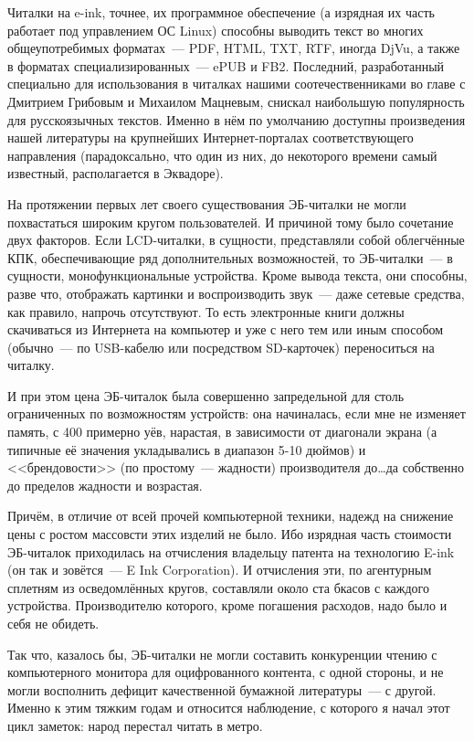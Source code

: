 Читалки на e-ink, точнее, их программное обеспечение (а изрядная их часть работает под управлением ОС Linux) способны выводить текст во многих общеупотребимых форматах~--- PDF, HTML, TXT, RTF, иногда DjVu, а также в форматах специализированных~--- ePUB и FB2. Последний, разработанный специально для использования в читалках нашими соотечественниками во главе с Дмитрием Грибовым и Михаилом Мацневым, снискал наибольшую популярность для русскоязычных текстов. Именно в нём по умолчанию доступны произведения нашей литературы на крупнейших Интернет-порталах соответствующего направления (парадоксально, что один из них, до некоторого времени самый известный, располагается в Эквадоре).

На протяжении первых лет своего существования ЭБ-читалки не могли похвастаться широким кругом пользователей. И причиной тому было сочетание двух факторов. Если LCD-читалки, в сущности, представляли собой облегчённые КПК, обеспечивающие ряд дополнительных возможностей, то ЭБ-читалки~--- в сущности, монофункциональные устройства. Кроме вывода текста, они способны, разве что, отображать картинки и воспроизводить звук~--- даже сетевые средства, как правило, напрочь отсутствуют. То есть электронные книги должны скачиваться из Интернета на компьютер и уже с него тем или иным способом (обычно~--- по USB-кабелю или посредством SD-карточек) переноситься на читалку.

И при этом цена ЭБ-читалок была совершенно запредельной для столь ограниченных по возможностям устройств: она начиналась, если мне не изменяет память, с 400 примерно уёв, нарастая, в зависимости от диагонали экрана (а типичные её значения укладывались в диапазон 5-10 дюймов) и <<брендовости>> (по простому~--- жадности) производителя до\dots да собственно до пределов жадности и возрастая.

Причём, в отличие от всей прочей компьютерной техники, надежд на снижение цены с ростом массовсти этих изделий не было. Ибо изрядная часть стоимости ЭБ-читалок приходилась на отчисления владельцу патента на технологию E-ink (он так и зовётся~--- E Ink Corporation). И отчисления эти, по агентурным сплетням из осведомлённых кругов, составляли около ста бкасов с каждого устройства. Производителю которого, кроме погашения расходов, надо было и себя не обидеть.

Так что, казалось бы, ЭБ-читалки не могли составить конкуренции чтению с компьютерного монитора для оцифрованного контента, с одной стороны, и не могли восполнить дефицит качественной бумажной литературы~--- с другой. Именно к этим тяжким годам и относится наблюдение, с которого я начал этот цикл заметок: народ перестал читать в метро.


